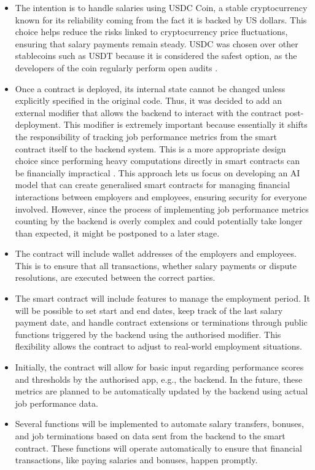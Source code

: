 \begin{itemize}
    \item The intention is to handle salaries using USDC Coin, a stable cryptocurrency known for its reliability coming from the fact it is backed by US dollars. This choice helps reduce the risks linked to cryptocurrency price fluctuations, ensuring that salary payments remain steady. USDC was chosen over other stablecoins such as USDT because it is considered the safest option, as the developers of the coin regularly perform open audits \cite{LyonsEtAl2023, VediaEtAl2023}.
    \item Once a contract is deployed, its internal state cannot be changed unless explicitly specified in the original code. Thus, it was decided to add an external modifier that allows the backend to interact with the contract post-deployment. This modifier is extremely important because essentially it shifts the responsibility of tracking job performance metrics from the smart contract itself to the backend system. This is a more appropriate design choice since performing heavy computations directly in smart contracts can be financially impractical \cite{Buterin2014}. This approach lets us focus on developing an AI model that can create generalised smart contracts for managing financial interactions between employers and employees, ensuring security for everyone involved. However, since the process of implementing job performance metrics counting by the backend is overly complex and could potentially take longer than expected, it might be postponed to a later stage.
    \item The contract will include wallet addresses of the employers and employees. This is to ensure that all transactions, whether salary payments or dispute resolutions, are executed between the correct parties.
    \item The smart contract will include features to manage the employment period. It will be possible to set start and end dates, keep track of the last salary payment date, and handle contract extensions or terminations through public functions triggered by the backend using the authorised modifier. This flexibility allows the contract to adjust to real-world employment situations.
    \item Initially, the contract will allow for basic input regarding performance scores and thresholds by the authorised app, e.g., the backend. In the future, these metrics are planned to be automatically updated by the backend using actual job performance data. 
    \item Several functions will be implemented to automate salary transfers, bonuses, and job terminations based on data sent from the backend to the smart contract. These functions will operate automatically to ensure that financial transactions, like paying salaries and bonuses, happen promptly.
\end{itemize}

